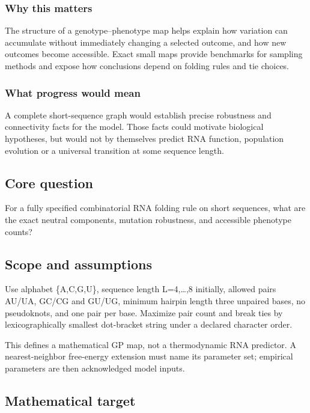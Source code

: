 \documentclass[
  11pt,
]{article}
\begin{document}
\subsubsection{Why this matters}

The structure of a genotype--phenotype map helps explain how variation
can accumulate without immediately changing a selected outcome, and how
new outcomes become accessible. Exact small maps provide benchmarks for
sampling methods and expose how conclusions depend on folding rules and
tie choices.

\subsubsection{What progress would mean}

A complete short-sequence graph would establish precise robustness and
connectivity facts for the model. Those facts could motivate biological
hypotheses, but would not by themselves predict RNA function, population
evolution or a universal transition at some sequence length.

\subsection{Core question}

For a fully specified combinatorial RNA folding rule on short sequences,
what are the exact neutral components, mutation robustness, and
accessible phenotype counts?

\subsection{Scope and assumptions}

Use alphabet \{A,C,G,U\}, sequence length L=4,\ldots,8 initially,
allowed pairs AU/UA, GC/CG and GU/UG, minimum hairpin length three
unpaired bases, no pseudoknots, and one pair per base. Maximize pair
count and break ties by lexicographically smallest dot-bracket string
under a declared character order.

This defines a mathematical GP map, not a thermodynamic RNA predictor. A
nearest-neighbor free-energy extension must name its parameter set;
empirical parameters are then acknowledged model inputs.

\subsection{Mathematical target}
\end{document}
